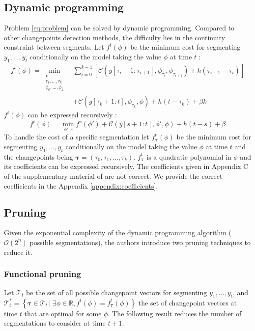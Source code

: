 \documentclass[11pt]{article}
\begin{document}
\subsection{Dynamic programming}

Problem \eqref{eq:problem} can be solved by dynamic programming. Compared to other changepoints detection methods, the difficulty lies in the continuity constraint between segments. Let $f^t(\phi)$ be the minimum cost for segmenting $y_1,\dots,y_t$ conditionally on the model taking the value $\phi$ at time $t$ :
\begin{equation}
    \begin{aligned}
        f^t(\phi)=\min_{\substack{k                                             \\\tau_1,\dots,\tau_{k}                         \\ \phi_0,\dots,\phi_k}} &\sum_{i=0}^{k-1} \left[\mathcal{C}(y[\tau_i+1:\tau_{i+1}],\phi_{\tau_i},\phi_{\tau_{i+1}}) + h(\tau_{i+1}-\tau_i)\right]\\
         & +\mathcal{C}(y[\tau_k+1:t],\phi_{\tau_k},\phi)+h(t-\tau_k) + \beta k
    \end{aligned}
\end{equation}
$f^t(\phi)$ can be expressed recursively :
\begin{equation}
    f^t(\phi)=\min_{\phi',s} f^s(\phi')+\mathcal{C}(y[s+1:t],\phi',\phi)+h(t-s)+\beta
\end{equation}
To handle the cost of a specific segmentation let $f^t_{\boldsymbol{\tau}}(\phi)$ be the minimum cost for segmenting $y_1,\dots,y_t$ conditionally on the model taking the value $\phi$ at time $t$ and the changepoints being $\boldsymbol{\tau}=(\tau_0,\tau_1,\dots,\tau_k)$. $f^t_{\boldsymbol{\tau}}$ is a quadratic polynomial in $\phi$ and its coefficients can be expressed recursively. The coefficients given in Appendix C of the supplementary material of \cite{main_article} are not correct. We provide the correct coefficients in the Appendix \ref{appendix:coefficients}.

\subsection{Pruning}

Given the exponential complexity of the dynamic programming algorithm ($\mathcal{O}(2^n)$ possible segmentations), the authors introduce two pruning techniques to reduce it.

\subsubsection{Functional pruning} Let $\mathcal{T}_t$ be the set of all possible changepoint vectors for segmenting $y_1,\dots,y_t$, and $\mathcal{T}_t^*=\left\{\boldsymbol{\tau}\in \mathcal{T}_t \:\big|\: \exists\phi\in\mathbb{R}, f^t(\phi)=f_{\boldsymbol{\tau}}^t(\phi)\right\}$ the set of changepoint vectors at time $t$ that are optimal for some $\phi$. The following result reduces the number of segmentations to consider at time $t+1$.
\end{document}
